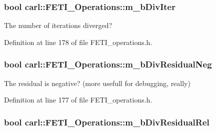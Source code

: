 \subsubsection[{m\+\_\+b\+Div\+Iter}]{\setlength{\rightskip}{0pt plus 5cm}bool carl\+::\+F\+E\+T\+I\+\_\+\+Operations\+::m\+\_\+b\+Div\+Iter\hspace{0.3cm}{\ttfamily [protected]}}\label{classcarl_1_1_f_e_t_i___operations_a7b94d72a58cd40af15151c28147ceb96}


The number of iterations diverged? 



Definition at line 178 of file F\+E\+T\+I\+\_\+operations.\+h.

\hypertarget{classcarl_1_1_f_e_t_i___operations_a343191e25b52e6913b686039fb5bd318}{}
\subsubsection[{m\+\_\+b\+Div\+Residual\+Neg}]{\setlength{\rightskip}{0pt plus 5cm}bool carl\+::\+F\+E\+T\+I\+\_\+\+Operations\+::m\+\_\+b\+Div\+Residual\+Neg\hspace{0.3cm}{\ttfamily [protected]}}\label{classcarl_1_1_f_e_t_i___operations_a343191e25b52e6913b686039fb5bd318}


The residual is negative? (more usefull for debugging, really) 



Definition at line 177 of file F\+E\+T\+I\+\_\+operations.\+h.

\hypertarget{classcarl_1_1_f_e_t_i___operations_a458f022e3ad766fadeab7746ef60f117}{}
\subsubsection[{m\+\_\+b\+Div\+Residual\+Rel}]{\setlength{\rightskip}{0pt plus 5cm}bool carl\+::\+F\+E\+T\+I\+\_\+\+Operations\+::m\+\_\+b\+Div\+Residual\+Rel\hspace{0.3cm}{\ttfamily [protected]}}\label{classcarl_1_1_f_e_t_i___operations_a458f022e3ad766fadeab7746ef60f117}



